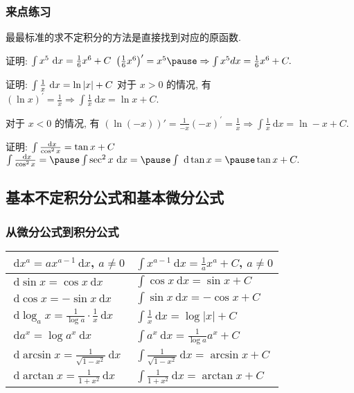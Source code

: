 \documentclass[
10pt,
aspectratio=43,
]{beamer}
\begin{document}
\begin{frame}
	\frametitle{来点练习}
	\everymath{\displaystyle}
	最最标准的求不定积分的方法是直接找到对应的原函数.
	{\small
	\begin{exampleblock}{证明: $\color{black}\int x^5 \mathrm{~d} x=\frac{1}{6} x^6+C$}
		\pause
		$
			\left(\frac{1}{6} x^6\right)^{\prime}=x^5 \pause \Rightarrow \int x^5 d x=\frac{1}{6} x^6+C.
		$
	\end{exampleblock}
	\pause
	\begin{exampleblock}{证明: $\color{black}\int \frac1x \mathrm{~d} x=\ln |x|+C$}
		\pause
		对于 $x>0$ 的情况, 有
		$
			(\ln x)^{\prime}=\frac{1}{x} \Rightarrow \int \frac{1}{x} \mathrm{~d} x=\ln x+C.
		$
		\pause

		对于 $x<0$ 的情况, 有
		$
			(\ln (-x))'=\frac{1}{-x}(-x)^{\prime}=\frac{1}{x} \Rightarrow \int \frac{1}{x} \mathrm{~d} x=\ln -x+C.
		$
	\end{exampleblock}

	\begin{exampleblock}{证明: $\color{black}\int \frac{\mathrm{~d} x}{\cos ^2 x}=\tan x+C$}
		\pause
		$
			\int \frac{\mathrm{~d} x}{\cos ^2 x}=\pause\int \sec ^2 x \mathrm{~d} x=\pause\int \mathrm{~d} \tan x=\pause\tan x+ C.
		$
	\end{exampleblock}
	}
\end{frame}

\subsection{基本不定积分公式和基本微分公式}
\begin{frame}
	\frametitle{从微分公式到积分公式}
	\everymath{\displaystyle}
	\renewcommand{\arraystretch}{2.3}
	\resizebox{\linewidth}{!}
	{
		\begin{tabular}{|p{}|p{}|}
			\hline
			$\mathrm{~d}x^a=ax^{a-1}\mathrm{~d}x$, $a\neq0$                   & $\int x^{a-1}\mathrm{~d}x=\frac{1}{a}x^{a}+C$, $a\neq0$  \\
			\hline
			$\mathrm{~d}\sin x=\cos x\mathrm{~d}x$                            & $\int \cos x\mathrm{~d}x = \sin x+C$                     \\
			\hline
			$\mathrm{~d}\cos x=-\sin x\mathrm{~d}x$                           & $\int \sin x\mathrm{~d}x=-\cos x +C$                     \\
			\hline
			$\mathrm{~d}\log_ax=\frac{1}{\log a}\cdot\frac{1}{x}\mathrm{~d}x$ & $\int \frac{1}{x}\mathrm{~d}x = \log |x|+C$              \\
			\hline
			$\mathrm{~d}a^x=\log a^x\mathrm{~d}x$                             & $\int a^x\mathrm{~d}x = \frac{1}{\log a}a^x+C$           \\
			\hline
			$\mathrm{~d}\arcsin x =\frac{1}{\sqrt{1-x^2}}\mathrm{~d}x$        & $\int \frac{1}{\sqrt{1-x^2}}\mathrm{~d}x = \arcsin x +C$ \\
			\hline
			$\mathrm{~d}\arctan x =\frac{1}{1+x^2}\mathrm{~d}x$               & $\int \frac{1}{1+x^2}\mathrm{~d}x = \arctan x +C$        \\
			\hline
		\end{tabular}
	}
\end{frame}
\end{document}
